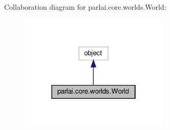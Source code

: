 Collaboration diagram for parlai.\+core.\+worlds.\+World\+:
\nopagebreak
\begin{figure}[H]
\begin{center}
\leavevmode
\includegraphics[width=202pt]{dc/ddb/classparlai_1_1core_1_1worlds_1_1World__coll__graph}
\end{center}
\end{figure}
